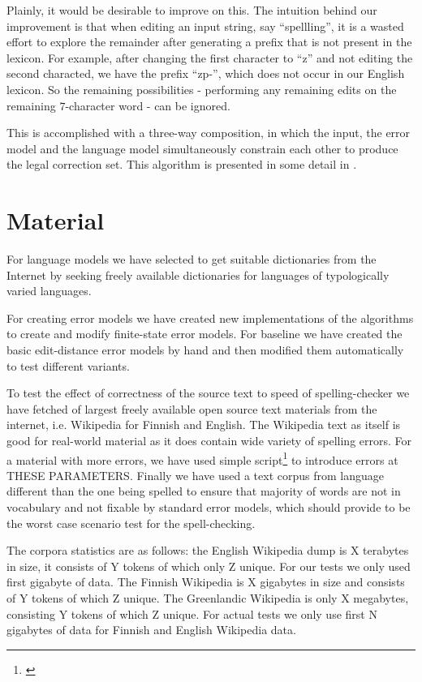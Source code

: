 \documentclass[11pt]{article}
\begin{document}
Plainly, it would be desirable to improve on this. The intuition behind our
improvement is that when editing an input string, say ``spellling'', it is a
wasted effort to explore the remainder after generating a prefix that is not
present in the lexicon. For example, after changing the first character to ``z''
and not editing the second characted, we have the prefix ``zp-'', which does
not occur in our English lexicon. So the remaining possibilities - performing
any remaining edits on the remaining $7$-character word - can be ignored.

This is accomplished with a three-way composition, in which the input, the
error model and the language model simultaneously constrain each other to
produce the legal correction set. This algorithm is presented in some detail in
\cite{hfst/2012/cla}.

\section{Material}
\label{sec:materials}

For language models
we have selected to get suitable dictionaries from the Internet by seeking
freely available dictionaries for languages of typologically varied
languages.

For creating error models we have created new implementations of the algorithms
to create and modify finite-state error models. For baseline we have created
the basic edit-distance error models by hand and then modified them
automatically to test different variants.

To test the effect of correctness of the source text to speed of
spelling-checker we have fetched of largest freely available open source text
materials from the internet, i.e. Wikipedia for Finnish and English. The
Wikipedia text as itself is good for real-world material as it does contain
wide variety of spelling errors. For a material with more errors, we have used
simple script\footnote{\url{}} to introduce errors at THESE PARAMETERS. Finally
we have used a text corpus from language different than the one being spelled
to ensure that majority of words are not in vocabulary and not fixable by
standard error models, which should provide to be the worst case scenario test
for the spell-checking.

The corpora statistics are as follows: the English Wikipedia dump is X terabytes
in size, it consists of Y tokens of which only Z unique. For our tests we
only used first gigabyte of data. The Finnish Wikipedia is X gigabytes in size
and consists of Y tokens of which Z unique. The Greenlandic Wikipedia is only
X megabytes, consisting Y tokens of which Z unique. For actual tests we only use
first N gigabytes of data for Finnish and English Wikipedia data.
\end{document}
